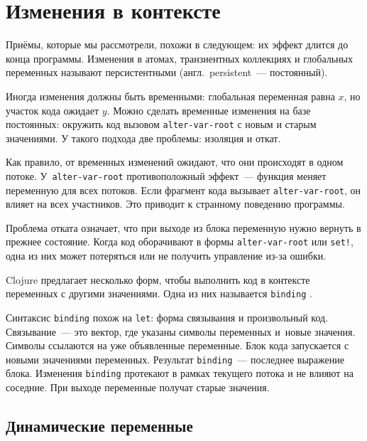 \fi

\section{Изменения в контексте}


Приёмы, которые мы рассмотрели, похожи в следующем: их эффект длится до конца
программы. Изменения в атомах, транзиентных коллекциях и глобальных переменных
называют персистентными (англ.~persistent~--- постоянный).

Иногда изменения должны быть временными: глобальная переменная равна $x$, но
участок кода ожидает $y$. Можно сделать временные изменения на базе постоянных:
окружить код вызовом \verb|alter-var-root| с новым и старым значениями. У
такого подхода две проблемы: изоляция и откат.


Как правило, от временных изменений ожидают, что они происходят в одном
потоке. У~\texttt{alter\--var\--root} противоположный эффект~--- функция меняет
переменную для всех потоков. Если фрагмент кода вызывает \verb|alter-var-root|,
он влияет на всех участников. Это приводит к странному поведению программы.

Проблема отката означает, что при выходе из блока переменную нужно вернуть в прежнее
состояние. Когда код оборачивают в формы \verb|alter-var-root| или \verb|set!|, одна
из них может потеряться или не получить управление из-за ошибки.

Clojure предлагает несколько форм, чтобы выполнить код в контексте переменных с
другими значениями. Одна из них называется \verb|binding| .


Синтаксис \verb|binding| похож на \verb|let|: форма связывания и произвольный
код. Связывание~--- это вектор, где указаны символы переменных и~новые
значения. Символы ссылаются на уже объявленные переменные. Блок кода запускается
с новыми значениями переменных. Результат \verb|binding|~--- последнее выражение
блока. Изменения \verb|binding| протекают в рамках текущего потока и не влияют
на соседние. При выходе переменные получат старые значения.

\subsection{Динамические переменные}

